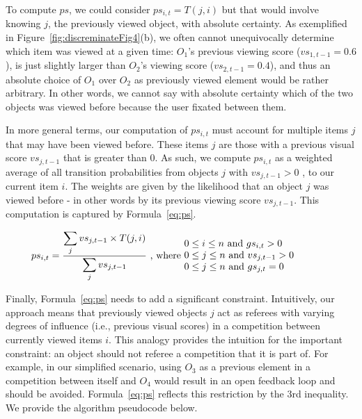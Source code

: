 To compute $ps$, we could consider $ps_{i,t} = T(j,i)$ but that would involve knowing $j$, the previously viewed object, with absolute certainty. As exemplified in Figure~\ref{fig:discreminateFig4}(b), we often cannot unequivocally determine which item was viewed at a given time: $O_1$'s previous viewing score ($vs_{1,t-1}=0.6$), is just slightly larger than $O_2$'s viewing score ($vs_{2,t-1}=0.4$), and thus an absolute choice of $O_1$ over $O_2$ as previously viewed element would be rather arbitrary.  In other words, we cannot say with absolute certainty which of the two objects was viewed before because the user fixated between them. 

In more general terms, our computation of $ps_{i,t}$ must account for multiple items $j$ that may have been viewed before. These items $j$ are those with a previous visual score $vs_{j,t-1}$ that is greater than $0$.  As such, we compute $ps_{i,t}$ as a weighted average of all transition probabilities from objects $j$ with $vs_{j,t-1} > 0$ , to our current item $i$. The weights are given by the likelihood that an object $j$ was viewed before - in other words by its previous viewing score $vs_{j,t-1}$. This computation is captured by Formula~\ref{eq:ps}.  

\begin{equation}
ps_{i,t} = \frac{\displaystyle\sum_{j} {vs_{j,t-1} \times T(j,i)}}{\displaystyle\sum_{j} vs_{j,t-1}} \text{ , where  } \parbox{15em}{$0\leq i \leq n$ and $gs_{i,t} > 0$\\$0\leq j \leq n$ and $vs_{j,t-1} > 0 $\\ $0\leq j \leq n$ and $gs_{j,t} = 0$ }
\label{eq:ps}
\end{equation} 

Finally, Formula~\ref{eq:ps} needs to add a significant constraint. Intuitively, our approach means that previously viewed objects $j$ act as referees with varying degrees of influence (i.e., previous visual scores) in a competition between currently viewed items $i$. This analogy provides the intuition for the important constraint: an object should not referee a competition that it is part of. For example, in our simplified scenario, using $O_3$ as a previous element in a competition between itself and $O_4$ would result in an open feedback loop and should be avoided. Formula~\ref{eq:ps} reflects this restriction by the 3rd inequality.  We provide the algorithm pseudocode below.

